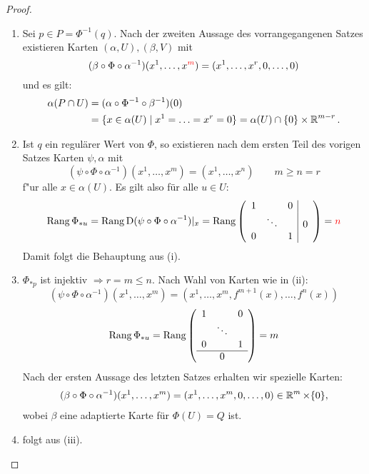 \begin{proof}\begin{enumerate}[label=(\roman*),widest=iii,leftmargin=*]
  \item Sei $p \in P = \Phi^{-1}(q)$. Nach der zweiten Aussage des vorrangegangenen Satzes existieren Karten $(\alpha,U), (\beta, V)$ mit 
	  \[ (\beta \circ \Phi \circ \alpha^{-1})(x^1,\ldots,x^{\textcolor{red}{m}}) = (x^1, \ldots,x^r, 0, \ldots, 0) \]
  und es gilt:
  \begin{align*}
    \alpha(P \cap U) & = (\alpha \circ \Phi^{-1} \circ \beta^{-1})(0) \\
    & = \{x \in \alpha (U) \mid x^1 = \ldots = x^r = 0\} = \alpha(U) \cap \{0\} \times \operatorname{\mathbb{R}}^{m-r}.
  \end{align*} 
  \item Ist $q$ ein regulärer Wert von $\Phi$, so existieren nach dem ersten Teil des vorigen Satzes Karten $\psi,\alpha$ mit 
      \[ (\psi \circ \Phi \circ \alpha^{-1})(x^1, \ldots, x^m) = (x^1, \ldots, x^n) \qquad m \geq n = r \]
  f"ur alle $x \in \alpha(U)$. Es gilt also für alle $u \in U$:
  \begin{align*}
    \operatorname{Rang} \Phi_{*u} = \operatorname{Rang} \operatorname{D}(\psi \circ \Phi \circ \alpha^{-1})|_x = \operatorname{Rang}
    \left(\begin{array}{ccc|c}
        1 &  & 0 & \\
        & \ddots & & 0 \\
        0 & & 1 & 
      \end{array}\right)
    = \textcolor{red}{n}
  \end{align*}
  Damit folgt die Behauptung aus (i).\\
  \item $\Phi_{*p}$ ist injektiv $\Rightarrow r = m \leq n$. Nach Wahl von Karten wie in (ii):
    \[ (\psi \circ \Phi \circ \alpha^{-1})(x^1, \ldots, x^m) = (x^1, \ldots, x^m,f^{m+1}(x), \ldots, f^n(x)) \]
    \[\operatorname{Rang} \Phi_{*u} = \operatorname{Rang} 
    \left( \begin{array}{ccc}
        1 & & 0 \\
        & \ddots &  \\
        0 & & 1 \\
        \hline
        & 0      & 
      \end{array} \right)
    = m \]
  Nach der ersten Aussage des letzten Satzes erhalten wir spezielle Karten:
  \begin{align*}
    (\beta \circ \Phi \circ \alpha^{-1})(x^1, \ldots, x^m) = (x^1, \ldots, x^m, 0, \ldots, 0) \in \operatorname{\mathbb{R}}^{m} \times \{0\},
  \end{align*}
  wobei $\beta$ eine adaptierte Karte für $\Phi(U) = Q$ ist.\\
  \item folgt aus (iii).
\end{enumerate}\end{proof}


